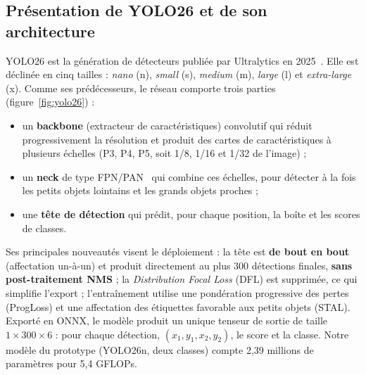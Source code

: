 \subsection{Présentation de YOLO26 et de son architecture}
YOLO26 est la génération de détecteurs publiée par Ultralytics en 2025~\cite{ultralytics26}. Elle est déclinée en
cinq tailles : \emph{nano} (n), \emph{small} (s), \emph{medium} (m), \emph{large} (l) et \emph{extra-large} (x). Comme
ses prédécesseurs, le réseau comporte trois parties (figure~\ref{fig:yolo26}) :
\begin{itemize}
  \item un \textbf{backbone} (extracteur de caractéristiques) convolutif qui réduit progressivement la résolution
        et produit des cartes de caractéristiques à plusieurs échelles (P3, P4, P5, soit 1/8, 1/16 et 1/32 de
        l'image) ;
  \item un \textbf{neck} de type FPN/PAN~\cite{lin2017fpn,liu2018panet} qui combine ces échelles, pour détecter à la fois
        les petits objets lointains et les grands objets proches ;
  \item une \textbf{tête de détection} qui prédit, pour chaque position, la boîte et les scores de classes.
\end{itemize}
Ses principales nouveautés visent le déploiement : la tête est \textbf{de bout en bout} (affectation un-à-un) et
produit directement au plus 300 détections finales, \textbf{sans post-traitement NMS} ; la \textit{Distribution Focal
Loss} (DFL) est supprimée, ce qui simplifie l'export ; l'entraînement utilise une pondération progressive des pertes
(ProgLoss) et une affectation des étiquettes favorable aux petits objets (STAL). Exporté en ONNX, le modèle produit
un unique tenseur de sortie de taille $1 \times 300 \times 6$ : pour chaque détection, $(x_1, y_1, x_2, y_2)$, le
score et la classe. Notre modèle du prototype (YOLO26n, deux classes) compte 2,39 millions de paramètres pour
5,4 GFLOPs.

